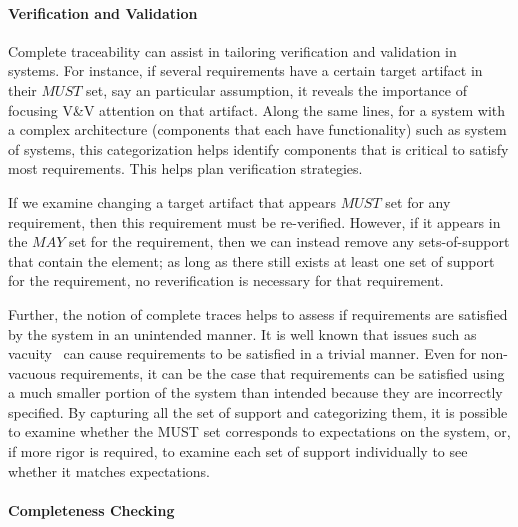 \paragraph{Verification and Validation}

Complete traceability can assist in tailoring verification and validation in systems. For instance, if several requirements have a certain target artifact in their $MUST$ set, say an particular assumption, it reveals the importance of focusing V\&V attention on that artifact. Along the same lines, for a system with a complex architecture (components that each have functionality) such as  system of systems, this categorization helps identify components that is critical to satisfy most requirements. This helps plan verification strategies.

If we examine changing a target artifact that appears $MUST$ set for any requirement, then this requirement must be re-verified. However, if it appears in the $MAY$ set for the requirement, then we can instead remove any sets-of-support that contain the element; as long as there still exists at least one set of support for the requirement, no reverification is necessary for that requirement.

Further, the notion of complete traces helps to assess if requirements are satisfied by the system in an unintended manner. It is well known that issues such as vacuity~\cite{kupferman2003vacuity} can cause requirements to be satisfied in a trivial manner. Even for non-vacuous requirements, it can be the case that requirements can be satisfied using a much smaller portion of the system than intended because they are incorrectly specified.  By capturing all the set of support and categorizing them, it is possible to examine whether the MUST set corresponds to expectations on the system, or, if more rigor is required, to examine each set of support individually to see whether it matches expectations.

\paragraph{Completeness Checking}

